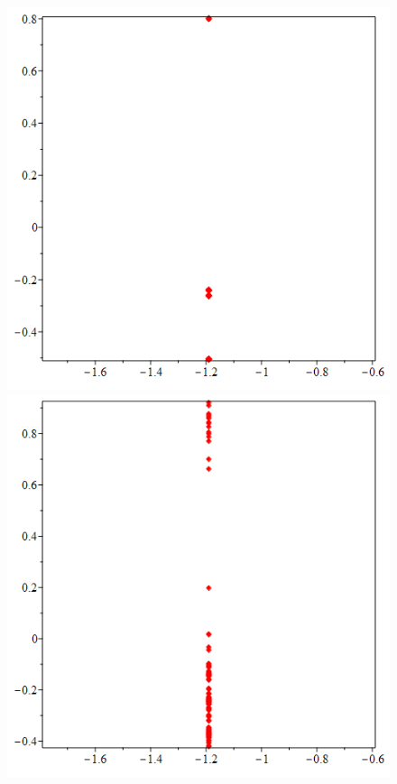 \documentclass[10pt,a4paper]{article}
\begin{document}
\begin{figure}[h]
		{\includegraphics[scale=0.2]{poincare f=0.8}}
		{\includegraphics[scale=0.2]{poincare f=1.1}}

\end{figure}
\end{document}
